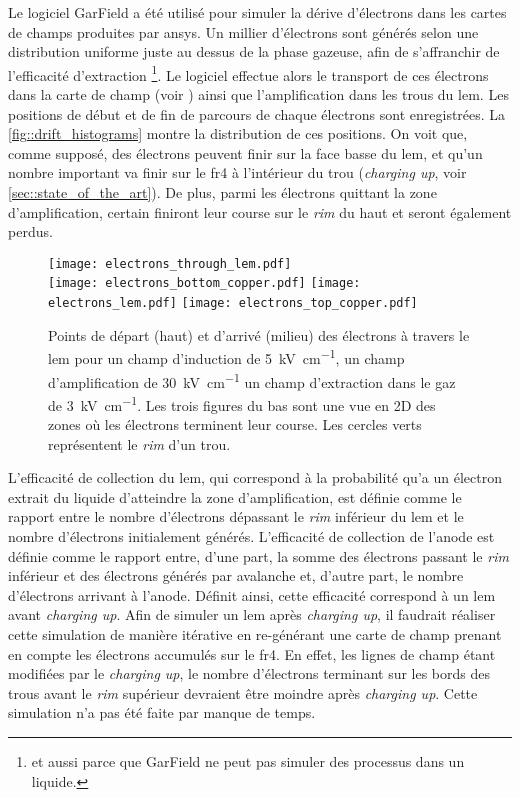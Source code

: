       Le logiciel GarField a été utilisé pour simuler la dérive d'électrons dans les cartes de champs produites par \gls{ansys}. Un millier d'électrons sont générés selon une distribution uniforme juste au dessus de la phase gazeuse, afin de s'affranchir de l'efficacité d'extraction \footnote{et aussi parce que GarField ne peut pas simuler des processus dans un liquide.}. Le logiciel effectue alors le transport de ces électrons dans la carte de champ (voir \cite{garfield}) ainsi que l'amplification dans les trous du \gls{lem}. Les positions de début et de fin de parcours de chaque électrons sont enregistrées. La \autoref{fig::drift_histograms} montre la distribution de ces positions. On voit que, comme supposé, des électrons peuvent finir sur la face basse du \gls{lem}, et qu'un nombre important va finir sur le \gls{fr4} à l'intérieur du trou (\textit{charging up}, voir \autoref{sec::state_of_the_art}). De plus, parmi les électrons quittant la zone d'amplification, certain finiront leur course sur le \textit{rim} du haut et seront également perdus.

      \begin{figure}[!htb]
        \centering
        \texttt{[image: electrons\_through\_lem.pdf]}\\\vspace{0.1cm}
        \texttt{[image: electrons\_bottom\_copper.pdf]}
        \texttt{[image: electrons\_lem.pdf]}
        \texttt{[image: electrons\_top\_copper.pdf]}
        \caption[Points de départ et d'arrivé des électrons à travers le LEM]{\label{fig::drift_histograms}Points de départ (haut) et d'arrivé (milieu) des électrons à travers le \gls{lem} pour un champ d'induction de \SI{5}{\kilo\volt\per\centi\meter}, un champ d'amplification de \SI{30}{\kilo\volt\per\centi\meter} un champ d'extraction dans le gaz de \SI{3}{\kilo\volt\per\centi\meter}. Les trois figures du bas sont une vue en 2D des zones où les électrons terminent leur course. Les cercles verts représentent le \textit{rim} d'un trou.}
      \end{figure}
          
      L'efficacité de collection du \gls{lem}, qui correspond à la probabilité qu'a un électron extrait du liquide d'atteindre la zone d'amplification, est définie comme le rapport entre le nombre d'électrons dépassant le \textit{rim} inférieur du \gls{lem} et le nombre d'électrons initialement générés. L'efficacité de collection de l'anode est définie comme le rapport entre, d'une part, la somme des électrons passant le \textit{rim} inférieur et des électrons générés par avalanche et, d'autre part, le nombre d'électrons arrivant à l'anode. Définit ainsi, cette efficacité correspond à un \gls{lem} avant \textit{charging up}. Afin de simuler un \gls{lem} après \textit{charging up}, il faudrait réaliser cette simulation de manière itérative en re-générant une carte de champ prenant en compte les électrons accumulés sur le \gls{fr4}. En effet, les lignes de champ étant modifiées par le \textit{charging up}, le nombre d'électrons terminant sur les bords des trous avant le \textit{rim} supérieur devraient être moindre après \textit{charging up}. Cette simulation n'a pas été faite par manque de temps.
        
